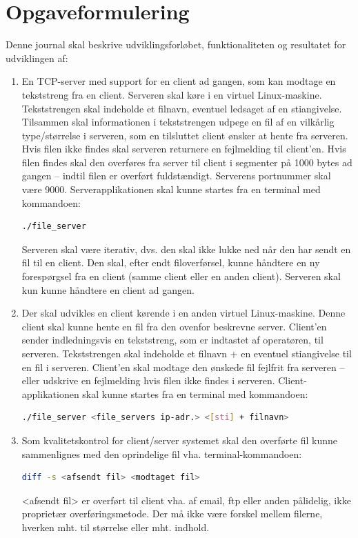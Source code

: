 \documentclass[12pt,fleqn,a4paper]{report}
\begin{document}
\section{Opgaveformulering}
Denne journal skal beskrive udviklingsforløbet, funktionaliteten og resultatet for udviklingen af:
\begin{enumerate}
	\item En TCP-server med support for en client ad gangen, som kan modtage
	en tekststreng fra en client. Serveren skal køre i en virtuel Linux-maskine.
	Tekststrengen skal indeholde et filnavn, eventuel ledsaget af en stiangivelse.
	Tilsammen skal informationen i tekststrengen udpege en fil af en vilkårlig
	type/størrelse i serveren, som en tilsluttet client ønsker at hente fra serveren. Hvis filen ikke findes skal serveren returnere en fejlmelding til client’en. Hvis filen findes skal den overføres fra server til client i segmenter på 1000 bytes ad gangen – indtil filen er overført fuldstændigt. Serverens portnummer skal være 9000. Serverapplikationen skal kunne startes fra en terminal med kommandoen:
	\begin{lstlisting}[backgroundcolor = \color{lightgray}, language=bash]
	./file_server
	\end{lstlisting}
	Serveren skal være iterativ, dvs. den skal ikke lukke ned når den har sendt en fil til en client. Den skal, efter endt filoverførsel, kunne håndtere en ny forespørgsel fra en client (samme client eller en anden client).
	Serveren skal kun kunne håndtere en client ad gangen.
	
	\item Der skal udvikles en client kørende i en anden virtuel Linux-maskine. Denne client skal kunne hente en fil fra den ovenfor beskrevne server. Client’en sender indledningsvis en tekststreng, som er indtastet af operatøren, til serveren.
	Tekststrengen skal indeholde et filnavn + en eventuel stiangivelse til en fil i serveren. Client’en skal modtage den ønskede fil fejlfrit fra serveren – eller udskrive en fejlmelding hvis filen ikke findes i serveren. Client-applikationen skal kunne startes fra en terminal med kommandoen:
	\begin{lstlisting}[backgroundcolor = \color{lightgray}, language=bash]
	./file_server <file_servers ip-adr.> <[sti] + filnavn>
	\end{lstlisting}
	
	\item Som kvalitetskontrol for client/server systemet skal den overførte fil kunne sammenlignes med den oprindelige fil vha. terminal-kommandoen:
	\begin{lstlisting}[backgroundcolor = \color{lightgray}, language=bash]
	diff -s <afsendt fil> <modtaget fil>
	\end{lstlisting}
	<afsendt fil> er overført til client vha. af email, ftp eller anden pålidelig, ikke proprietær overføringsmetode.
	Der må ikke være forskel mellem filerne, hverken mht. til størrelse eller mht. indhold.

\end{enumerate}
\end{document}
